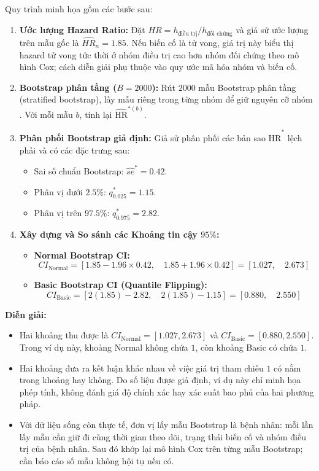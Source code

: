 Quy trình minh họa gồm các bước sau:
\begin{enumerate}
	\item \textbf{Ước lượng Hazard Ratio:} Đặt $HR=h_{\text{điều trị}}/h_{\text{đối chứng}}$ và giả sử ước lượng trên mẫu gốc là $\widehat{HR}_n=1.85$. Nếu biến cố là tử vong, giá trị này biểu thị hazard tử vong tức thời ở nhóm điều trị cao hơn nhóm đối chứng theo mô hình Cox; cách diễn giải phụ thuộc vào quy ước mã hóa nhóm và biến cố.
	\item \textbf{Bootstrap phân tầng ($B=2000$):} Rút $2000$ mẫu Bootstrap phân tầng (stratified bootstrap), lấy mẫu riêng trong từng nhóm để giữ nguyên cỡ nhóm \cite{davison1997}. Với mỗi mẫu $b$, tính lại $\widehat{\text{HR}}^{*(b)}$.
	\item \textbf{Phân phối Bootstrap giả định:} Giả sử phân phối các bản sao $\widehat{\text{HR}}^*$ lệch phải và có các đặc trưng sau:
	\begin{itemize}
		\item Sai số chuẩn Bootstrap: $\widehat{se}^* = 0.42$.
		\item Phân vị dưới $2.5\%$: $q_{0.025}^* = 1.15$.
		\item Phân vị trên $97.5\%$: $q_{0.975}^* = 2.82$.
	\end{itemize}
	\item \textbf{Xây dựng và So sánh các Khoảng tin cậy $95\%$:}
	\begin{itemize}
		\item \textbf{Normal Bootstrap CI:}
		\begin{equation}
			CI_{\text{Normal}} = [1.85 - 1.96 \times 0.42, \quad 1.85 + 1.96 \times 0.42] = [1.027, \quad 2.673]
		\end{equation}
		\item \textbf{Basic Bootstrap CI (Quantile Flipping):}
		\begin{equation}
			CI_{\text{Basic}} = [2(1.85) - 2.82, \quad 2(1.85) - 1.15] = [0.880, \quad 2.550]
		\end{equation}
	\end{itemize}
\end{enumerate}

\textbf{Diễn giải:}
\begin{itemize}
	\item Hai khoảng thu được là
	$CI_{\text{Normal}}=[1.027,2.673]$ và
	$CI_{\text{Basic}}=[0.880,2.550]$. Trong ví dụ này, khoảng Normal
	không chứa $1$, còn khoảng Basic có chứa $1$.
	
	\item Hai khoảng đưa ra kết luận khác nhau về việc giá trị tham chiếu $1$
	có nằm trong khoảng hay không. Do số liệu được giả định, ví dụ này chỉ
	minh họa phép tính, không đánh giá độ chính xác hay xác suất bao phủ của
	hai phương pháp.
	
	\item Với dữ liệu sống còn thực tế, đơn vị lấy mẫu Bootstrap là bệnh nhân:
	mỗi lần lấy mẫu cần giữ đi cùng thời gian theo dõi, trạng thái biến cố
	và nhóm điều trị của bệnh nhân. Sau đó khớp lại mô hình Cox trên từng
	mẫu Bootstrap; cần báo cáo số mẫu không hội tụ nếu có.
\end{itemize}
